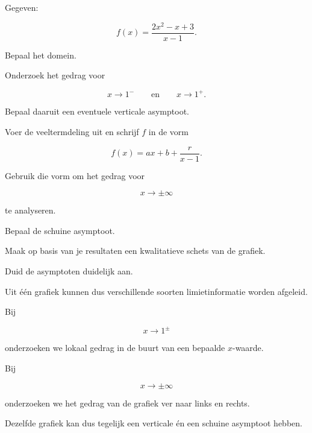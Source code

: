 \documentclass{ximera}
\begin{document}
\begin{oefening}{\oefU\ESS}

Gegeven:

\[
f(x)=\frac{2x^2-x+3}{x-1}.
\]

\begin{question}
Bepaal het domein.
\end{question}

\begin{question}
Onderzoek het gedrag voor

\[
x\to1^-
\qquad\text{en}\qquad
x\to1^+.
\]

Bepaal daaruit een eventuele verticale asymptoot.
\end{question}

\begin{question}
Voer de veeltermdeling uit en schrijf $f$ in de vorm

\[
f(x)=ax+b+\frac{r}{x-1}.
\]

\end{question}

\begin{question}
Gebruik die vorm om het gedrag voor

\[
x\to\pm\infty
\]

te analyseren.
\end{question}

\begin{question}
Bepaal de schuine asymptoot.
\end{question}

\begin{question}
Maak op basis van je resultaten een kwalitatieve schets van de
grafiek.

Duid de asymptoten duidelijk aan.
\end{question}

\end{oefening}

\begin{opmerking}

    Uit één grafiek kunnen dus verschillende soorten limietinformatie
    worden afgeleid.
    
    Bij
    
    \[
    x\to1^\pm
    \]
    
    onderzoeken we lokaal gedrag in de buurt van een bepaalde
    $x$-waarde.
    
    Bij
    
    \[
    x\to\pm\infty
    \]
    
    onderzoeken we het gedrag van de grafiek ver naar links en rechts.
    
    Dezelfde grafiek kan dus tegelijk een verticale én een schuine
    asymptoot hebben.
    
    \end{opmerking}
\end{document}
